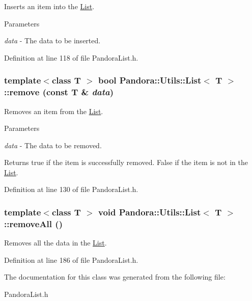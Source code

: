 Inserts an item into the \hyperlink{classPandora_1_1Utils_1_1List}{List}. 
\begin{DoxyParams}{Parameters}
\item[{\em data}]-\/ The data to be inserted. \end{DoxyParams}


Definition at line 118 of file PandoraList.h.\hypertarget{classPandora_1_1Utils_1_1List_a045ecf8edb94f60efc41a5d864c7dca6}{
\subsubsection[{remove}]{\setlength{\rightskip}{0pt plus 5cm}template$<$class T $>$ bool {\bf Pandora::Utils::List}$<$ T $>$::remove (const T \& {\em data})}}
\label{classPandora_1_1Utils_1_1List_a045ecf8edb94f60efc41a5d864c7dca6}


Removes an item from the \hyperlink{classPandora_1_1Utils_1_1List}{List}. 
\begin{DoxyParams}{Parameters}
\item[{\em data}]-\/ The data to be removed. \end{DoxyParams}
\begin{DoxyReturn}{Returns}
true if the item is successfully removed. False if the item is not in the \hyperlink{classPandora_1_1Utils_1_1List}{List}. 
\end{DoxyReturn}


Definition at line 130 of file PandoraList.h.\hypertarget{classPandora_1_1Utils_1_1List_a2dcb0105be0541caf1084c7faa4d1566}{
\subsubsection[{removeAll}]{\setlength{\rightskip}{0pt plus 5cm}template$<$class T $>$ void {\bf Pandora::Utils::List}$<$ T $>$::removeAll ()}}
\label{classPandora_1_1Utils_1_1List_a2dcb0105be0541caf1084c7faa4d1566}


Removes all the data in the \hyperlink{classPandora_1_1Utils_1_1List}{List}. 

Definition at line 186 of file PandoraList.h.

The documentation for this class was generated from the following file:\begin{DoxyCompactItemize}
\item 
PandoraList.h\end{DoxyCompactItemize}
